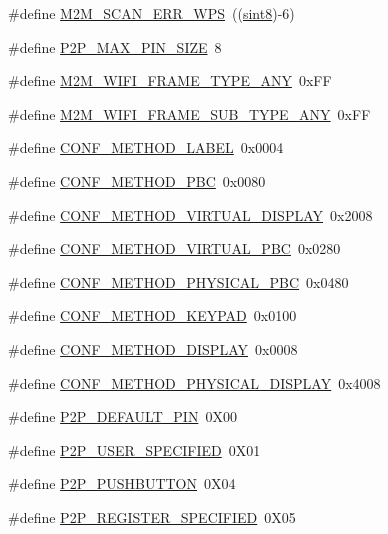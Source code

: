 \begin{DoxyCompactItemize}
\item 
\#define \hyperlink{group__WlanDefines_ga46a2ed245a4ee742b0c9dcdf26825025}{M2\+M\+\_\+\+S\+C\+A\+N\+\_\+\+E\+R\+R\+\_\+\+W\+PS}~((\hyperlink{group__DataT_gae35f10ffd0ac8dd2bc3e794da9bdfbc7}{sint8})-\/6)
\item 
\#define \hyperlink{group__WlanDefines_ga4fa7157264d4384874b272c57a6083f6}{P2\+P\+\_\+\+M\+A\+X\+\_\+\+P\+I\+N\+\_\+\+S\+I\+ZE}~8
\item 
\#define \hyperlink{group__WlanDefines_gaef2548c6a34869fbbaa1055ba537a7e6}{M2\+M\+\_\+\+W\+I\+F\+I\+\_\+\+F\+R\+A\+M\+E\+\_\+\+T\+Y\+P\+E\+\_\+\+A\+NY}~0x\+FF
\item 
\#define \hyperlink{group__WlanDefines_ga63b89cf8396db0c50077e1fec7f3d0ed}{M2\+M\+\_\+\+W\+I\+F\+I\+\_\+\+F\+R\+A\+M\+E\+\_\+\+S\+U\+B\+\_\+\+T\+Y\+P\+E\+\_\+\+A\+NY}~0x\+FF
\item 
\#define \hyperlink{group__WlanDefines_ga43a9727ecabb94295de8032b3cafb43e}{C\+O\+N\+F\+\_\+\+M\+E\+T\+H\+O\+D\+\_\+\+L\+A\+B\+EL}~0x0004
\item 
\#define \hyperlink{group__WlanDefines_ga7db50ac40f1ff02b3949ee0a5844986f}{C\+O\+N\+F\+\_\+\+M\+E\+T\+H\+O\+D\+\_\+\+P\+BC}~0x0080
\item 
\#define \hyperlink{group__WlanDefines_gacd853ad056d4bfe2b030d44c0ccf7863}{C\+O\+N\+F\+\_\+\+M\+E\+T\+H\+O\+D\+\_\+\+V\+I\+R\+T\+U\+A\+L\+\_\+\+D\+I\+S\+P\+L\+AY}~0x2008
\item 
\#define \hyperlink{group__WlanDefines_ga4a5f55843f4f1efd2af79c37780806ef}{C\+O\+N\+F\+\_\+\+M\+E\+T\+H\+O\+D\+\_\+\+V\+I\+R\+T\+U\+A\+L\+\_\+\+P\+BC}~0x0280
\item 
\#define \hyperlink{group__WlanDefines_ga4273f9b891dd72f73aeb09332355c451}{C\+O\+N\+F\+\_\+\+M\+E\+T\+H\+O\+D\+\_\+\+P\+H\+Y\+S\+I\+C\+A\+L\+\_\+\+P\+BC}~0x0480
\item 
\#define \hyperlink{group__WlanDefines_gad704d19b15d73ed94b3fd1d6680d64fd}{C\+O\+N\+F\+\_\+\+M\+E\+T\+H\+O\+D\+\_\+\+K\+E\+Y\+P\+AD}~0x0100
\item 
\#define \hyperlink{group__WlanDefines_ga592a7699017d63037a8526f3bacb1f0b}{C\+O\+N\+F\+\_\+\+M\+E\+T\+H\+O\+D\+\_\+\+D\+I\+S\+P\+L\+AY}~0x0008
\item 
\#define \hyperlink{group__WlanDefines_gae3d76f4b192d6e9c5bb38d6213ae95de}{C\+O\+N\+F\+\_\+\+M\+E\+T\+H\+O\+D\+\_\+\+P\+H\+Y\+S\+I\+C\+A\+L\+\_\+\+D\+I\+S\+P\+L\+AY}~0x4008
\item 
\#define \hyperlink{group__WlanDefines_ga1f3f079b198595a55feb27f45dd308c7}{P2\+P\+\_\+\+D\+E\+F\+A\+U\+L\+T\+\_\+\+P\+IN}~0\+X00
\item 
\#define \hyperlink{group__WlanDefines_ga47c2d105f8811042e073e24da159f7e0}{P2\+P\+\_\+\+U\+S\+E\+R\+\_\+\+S\+P\+E\+C\+I\+F\+I\+ED}~0\+X01
\item 
\#define \hyperlink{group__WlanDefines_gaffcfeea7f4f54c43415f4719ee003b6d}{P2\+P\+\_\+\+P\+U\+S\+H\+B\+U\+T\+T\+ON}~0\+X04
\item 
\#define \hyperlink{group__WlanDefines_gafedb3d120890ec64f55e45a1a1b8709c}{P2\+P\+\_\+\+R\+E\+G\+I\+S\+T\+E\+R\+\_\+\+S\+P\+E\+C\+I\+F\+I\+ED}~0\+X05
\end{DoxyCompactItemize}


